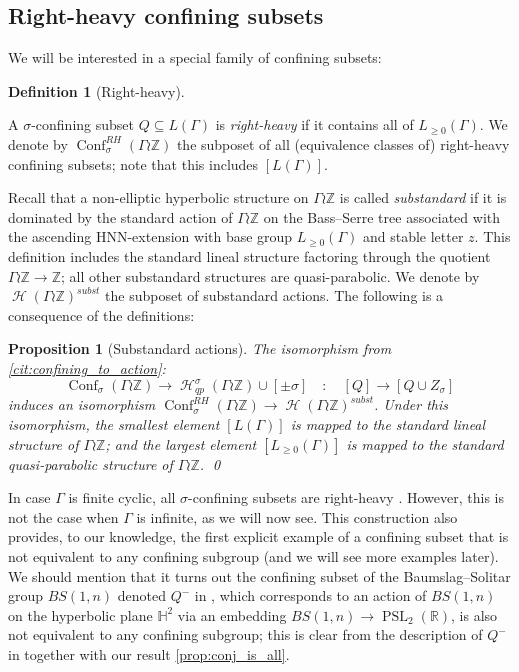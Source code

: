 \documentclass[reqno,12pt]{amsart}\setcounter{tocdepth}{1}
\newtheorem{proposition}[theorem]{Proposition}
\theoremstyle{definition}
\newtheorem{definition}[theorem]{Definition}
\newcommand{\Z}{\mathbb{Z}}
\newcommand{\R}{\mathbb{R}}
\DeclareMathOperator{\PSL}{PSL}
\DeclareMathOperator{\Hyp}{\mathcal{H}}
\DeclareMathOperator{\Conf}{Conf}
\numberwithin{equation}{section}
\begin{document}
\subsection{Right-heavy confining subsets}

We will be interested in a special family of confining subsets:

\begin{definition}[Right-heavy]
\label{def:rh}

A $\sigma$-confining subset $Q \subseteq L(\Gamma)$ is \emph{right-heavy} if it contains all of $L_{\geq 0}(\Gamma)$. We denote by $\Conf_\sigma^{RH}(\Gamma \wr \Z)$ the subposet of all (equivalence classes of) right-heavy confining subsets; note that this includes $[L(\Gamma)]$.
\end{definition}

Recall that a non-elliptic hyperbolic structure on $\Gamma \wr \Z$ is called \emph{substandard} if it is dominated by the standard action of $\Gamma \wr \Z$ on the Bass--Serre tree associated with the ascending HNN-extension with base group $L_{\geq 0}(\Gamma)$ and stable letter $z$. This definition includes the standard lineal structure factoring through the quotient $\Gamma \wr \Z \to \Z$; all other substandard structures are quasi-parabolic. We denote by $\Hyp(\Gamma \wr \Z)^{subst}$ the subposet of substandard actions. The following is a consequence of the definitions:

\begin{proposition}[Substandard actions]
\label{prop:substandard}
The isomorphism from \cref{cit:confining_to_action}: 
\[\Conf_\sigma(\Gamma \wr \Z) \to \Hyp_{qp}^\sigma(\Gamma \wr \Z) \cup [\pm \sigma] \quad \colon \quad [Q] \to [Q \cup Z_\sigma]\]
induces an isomorphism $\Conf_\sigma^{RH}(\Gamma \wr \Z) \to \Hyp(\Gamma \wr \Z)^{subst}$. Under this isomorphism, the smallest element $[L(\Gamma)]$ is mapped to the standard lineal structure of $\Gamma \wr \Z$; and the largest element $[L_{\geq 0}(\Gamma)]$ is mapped to the standard quasi-parabolic structure of $\Gamma \wr \Z$. \qed
\end{proposition}

In case $\Gamma$ is finite cyclic, all $\sigma$-confining subsets are right-heavy \cite{sahana:wreath}. However, this is not the case when $\Gamma$ is infinite, as we will now see. This construction also provides, to our knowledge, the first explicit example of a confining subset that is not equivalent to any confining subgroup (and we will see more examples later). We should mention that it turns out the confining subset of the Baumslag--Solitar group $BS(1,n)$ denoted $Q^-$ in \cite{AR:BS}, which corresponds to an action of $BS(1,n)$ on the hyperbolic plane $\mathbb{H}^2$ via an embedding $BS(1,n)\to \PSL_2(\R)$, is also not equivalent to any confining subgroup; this is clear from the description of $Q^-$ in \cite[Lemma~3.1]{AR:BS} together with our result \cref{prop:conj_is_all}.
\end{document}
